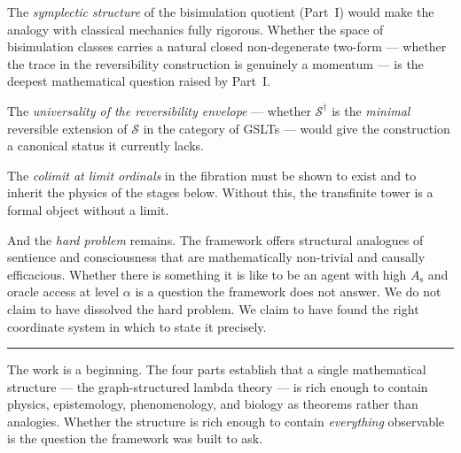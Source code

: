 \documentclass[12pt]{article}
\theoremstyle{remark}
\newcommand{\GSLT}{\mathcal{S}}
\newcommand{\sent}{A_{\mathrm{s}}}
\begin{document}
The \emph{symplectic structure} of the bisimulation quotient
(Part~I) would make the analogy with classical mechanics fully
rigorous.
Whether the space of bisimulation classes carries a natural
closed non-degenerate two-form --- whether the trace in the
reversibility construction is genuinely a momentum --- is the
deepest mathematical question raised by Part~I.

The \emph{universality of the reversibility envelope} --- whether
$\GSLT^\dagger$ is the \emph{minimal} reversible extension of
$\GSLT$ in the category of GSLTs --- would give the construction
a canonical status it currently lacks.

The \emph{colimit at limit ordinals} in the fibration must be
shown to exist and to inherit the physics of the stages below.
Without this, the transfinite tower is a formal object without
a limit.

And the \emph{hard problem} remains.
The framework offers structural analogues of sentience and
consciousness that are mathematically non-trivial and causally
efficacious.
Whether there is something it is like to be an agent with high
$\sent$ and oracle access at level $\alpha$ is a question the
framework does not answer.
We do not claim to have dissolved the hard problem.
We claim to have found the right coordinate system in which to
state it precisely.

\vspace{2em}
\noindent\hrule
\vspace{1em}

\noindent
The work is a beginning.
The four parts establish that a single mathematical structure ---
the graph-structured lambda theory --- is rich enough to contain
physics, epistemology, phenomenology, and biology as theorems
rather than analogies.
Whether the structure is rich enough to contain \emph{everything}
observable is the question the framework was built to ask.



\newpage
{}
\end{document}
